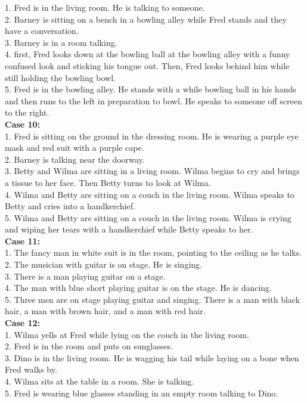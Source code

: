 \documentclass[10pt,twocolumn,letterpaper]{article}
\begin{document}
{{1. Fred is in the living room. He is talking to someone.\\
2. Barney is sitting on a bench in a bowling alley while Fred stands and they have a conversation.\\
3. Barney is in a room talking.\\
4. first, Fred looks down at the bowling ball at the bowling alley with a funny confused look and sticking his tongue out. Then, Fred looks behind him while still holding the bowling bowl.\\
5. Fred is in the bowling alley. He stands with a while bowling ball in his hands and then runs to the left in preparation to bowl. He speaks to someone off screen to the right.\\
\textbf{Case 10:}\\
1. Fred is sitting on the ground in the dressing room. He is wearing a purple eye mask and red suit with a purple cape.\\
2. Barney is talking near the doorway.\\
3. Betty and Wilma are sitting in a living room. Wilma begins to cry and brings a tissue to her face. Then Betty turns to look at Wilma.\\
4. Wilma and Betty are sitting on a couch in the living room. Wilma speaks to Betty and cries into a handkerchief.\\
5. Wilma and Betty are sitting on a couch in the living room. Wilma is crying and wiping her tears with a handkerchief while Betty speaks to her.\\
\textbf{Case 11:}\\
1. The fancy man in white suit is in the room, pointing to the ceiling as he talks.\\
2. The musician with guitar is on stage. He is singing.\\
3. There is a man playing guitar on a stage.\\
4. The man with blue short playing guitar is on the stage. He is dancing.\\
5. Three men are on stage playing guitar and singing. There is a man with black hair, a man with brown hair, and a man with red hair.\\
\textbf{Case 12:}\\
1. Wilma yells at Fred while lying on the couch in the living room.\\
2. Fred is in the room and puts on sunglasses.\\
3. Dino is in the living room. He is wagging his tail while laying on a bone when Fred walks by.\\
4. Wilma sits at the table in a room. She is talking.\\
5. Fred is wearing blue glasses standing in an empty room talking to Dino.
}}
\end{document}

